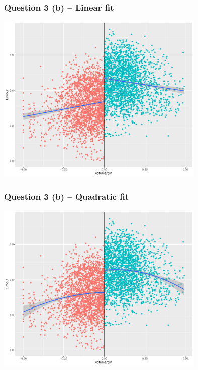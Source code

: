 \documentclass[xcolor=table,dvipsnames]{beamer}
\begin{document}
\begin{frame}
\frametitle{Question 3 (b) -- Linear fit}
\centering
\includegraphics[width=100mm]{pictures/week_22_3linfit.pdf} 
\end{frame}

\begin{frame}
\frametitle{Question 3 (b) -- Quadratic fit}
\centering
\includegraphics[width=100mm]{pictures/week_22_3sqrfit.pdf} 
\end{frame}
\end{document}
